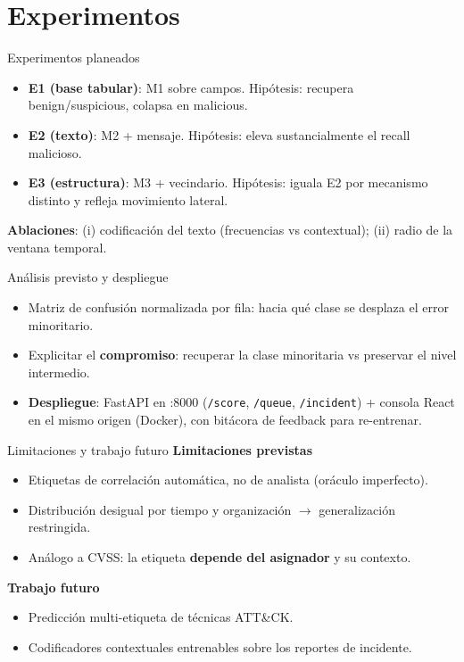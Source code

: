 \documentclass[aspectratio=169,10pt]{beamer}
\begin{document}
\section{Experimentos}
\begin{frame}{Experimentos planeados}
\begin{itemize}
\item \textbf{E1 (base tabular)}: M1 sobre campos. Hipótesis: recupera benign/suspicious, colapsa en malicious.
\item \textbf{E2 (texto)}: M2 + mensaje. Hip\'otesis: eleva sustancialmente el recall malicioso.
\item \textbf{E3 (estructura)}: M3 + vecindario. Hip\'otesis: iguala E2 por mecanismo distinto y refleja movimiento lateral.
\end{itemize}
\textbf{Ablaciones}: (i) codificación del texto (frecuencias vs contextual); (ii) radio de la ventana temporal.
\end{frame}

\begin{frame}{Análisis previsto y despliegue}
\begin{itemize}
\item Matriz de confusión normalizada por fila: hacia qu\'e clase se desplaza el error minoritario.
\item Explicitar el \textbf{compromiso}: recuperar la clase minoritaria vs preservar el nivel intermedio.
\item \textbf{Despliegue}: FastAPI en :8000 (\texttt{/score}, \texttt{/queue}, \texttt{/incident}) + consola React en el mismo origen (Docker), con bit\'acora de feedback para re-entrenar.
\end{itemize}
\end{frame}

\begin{frame}{Limitaciones y trabajo futuro}
\textbf{Limitaciones previstas}
\begin{itemize}
\item Etiquetas de correlación automática, no de analista (oráculo imperfecto).
\item Distribución desigual por tiempo y organización $\to$ generalización restringida.
\item Análogo a CVSS: la etiqueta \textbf{depende del asignador} y su contexto.
\end{itemize}
\textbf{Trabajo futuro}
\begin{itemize}
\item Predicción multi-etiqueta de técnicas ATT\&CK.
\item Codificadores contextuales entrenables sobre los reportes de incidente.
\end{itemize}
\end{frame}
\end{document}
